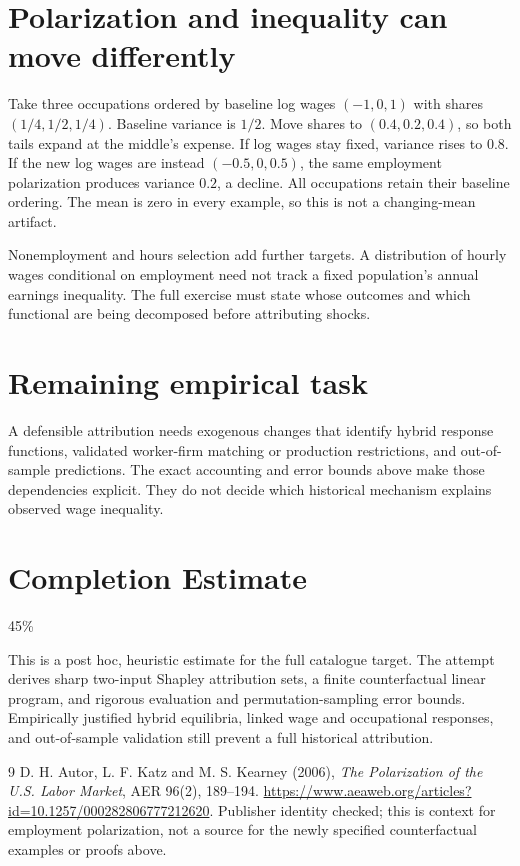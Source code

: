 \documentclass[11pt]{article}
\theoremstyle{definition}
\begin{document}
\section*{Polarization and inequality can move differently}
Take three occupations ordered by baseline log wages $(-1,0,1)$ with shares
$(1/4,1/2,1/4)$. Baseline variance is $1/2$. Move shares to $(0.4,0.2,0.4)$,
so both tails expand at the middle's expense. If log wages stay fixed, variance
rises to $0.8$. If the new log wages are instead $(-0.5,0,0.5)$, the same
employment polarization produces variance $0.2$, a decline. All occupations
retain their baseline ordering. The mean is zero in every example, so this is
not a changing-mean artifact.

Nonemployment and hours selection add further targets. A distribution of hourly
wages conditional on employment need not track a fixed population's annual
earnings inequality. The full exercise must state whose outcomes and which
functional are being decomposed before attributing shocks.

\section*{Remaining empirical task}
A defensible attribution needs exogenous changes that identify hybrid response
functions, validated worker-firm matching or production restrictions, and
out-of-sample predictions. The exact accounting and error bounds above make
those dependencies explicit. They do not decide which historical mechanism
explains observed wage inequality.

\section{Completion Estimate}
45\%

This is a post hoc, heuristic estimate for the full catalogue target.
The attempt derives sharp two-input Shapley attribution sets, a finite counterfactual linear program, and rigorous evaluation and permutation-sampling error bounds. Empirically justified hybrid equilibria, linked wage and occupational responses, and out-of-sample validation still prevent a full historical attribution.

\begin{thebibliography}{9}
 D. H. Autor, L. F. Katz and M. S. Kearney (2006),
\emph{The Polarization of the U.S. Labor Market}, AER 96(2), 189--194.
\url{https://www.aeaweb.org/articles?id=10.1257/000282806777212620}.
Publisher identity checked; this is context for employment polarization,
not a source for the newly specified counterfactual examples or proofs above.
\end{thebibliography}
\end{document}

